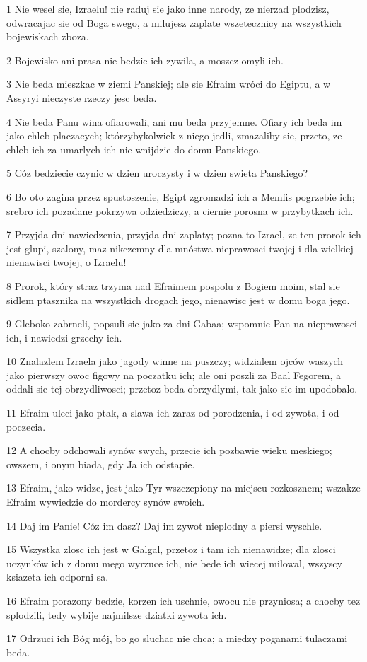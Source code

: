\par 1 Nie wesel sie, Izraelu! nie raduj sie jako inne narody, ze nierzad plodzisz, odwracajac sie od Boga swego, a milujesz zaplate wszetecznicy na wszystkich bojewiskach zboza.
\par 2 Bojewisko ani prasa nie bedzie ich zywila, a moszcz omyli ich.
\par 3 Nie beda mieszkac w ziemi Panskiej; ale sie Efraim wróci do Egiptu, a w Assyryi nieczyste rzeczy jesc beda.
\par 4 Nie beda Panu wina ofiarowali, ani mu beda przyjemne. Ofiary ich beda im jako chleb placzacych; którzybykolwiek z niego jedli, zmazaliby sie, przeto, ze chleb ich za umarlych ich nie wnijdzie do domu Panskiego.
\par 5 Cóz bedziecie czynic w dzien uroczysty i w dzien swieta Panskiego?
\par 6 Bo oto zagina przez spustoszenie, Egipt zgromadzi ich a Memfis pogrzebie ich; srebro ich pozadane pokrzywa odziedziczy, a ciernie porosna w przybytkach ich.
\par 7 Przyjda dni nawiedzenia, przyjda dni zaplaty; pozna to Izrael, ze ten prorok ich jest glupi, szalony, maz nikczemny dla mnóstwa nieprawosci twojej i dla wielkiej nienawisci twojej, o Izraelu!
\par 8 Prorok, który straz trzyma nad Efraimem pospolu z Bogiem moim, stal sie sidlem ptasznika na wszystkich drogach jego, nienawisc jest w domu boga jego.
\par 9 Gleboko zabrneli, popsuli sie jako za dni Gabaa; wspomnic Pan na nieprawosci ich, i nawiedzi grzechy ich.
\par 10 Znalazlem Izraela jako jagody winne na puszczy; widzialem ojców waszych jako pierwszy owoc figowy na poczatku ich; ale oni poszli za Baal Fegorem, a oddali sie tej obrzydliwosci; przetoz beda obrzydlymi, tak jako sie im upodobalo.
\par 11 Efraim uleci jako ptak, a slawa ich zaraz od porodzenia, i od zywota, i od poczecia.
\par 12 A chocby odchowali synów swych, przecie ich pozbawie wieku meskiego; owszem, i onym biada, gdy Ja ich odstapie.
\par 13 Efraim, jako widze, jest jako Tyr wszczepiony na miejscu rozkosznem; wszakze Efraim wywiedzie do mordercy synów swoich.
\par 14 Daj im Panie! Cóz im dasz? Daj im zywot nieplodny a piersi wyschle.
\par 15 Wszystka zlosc ich jest w Galgal, przetoz i tam ich nienawidze; dla zlosci uczynków ich z domu mego wyrzuce ich, nie bede ich wiecej milowal, wszyscy ksiazeta ich odporni sa.
\par 16 Efraim porazony bedzie, korzen ich uschnie, owocu nie przyniosa; a chocby tez splodzili, tedy wybije najmilsze dziatki zywota ich.
\par 17 Odrzuci ich Bóg mój, bo go sluchac nie chca; a miedzy poganami tulaczami beda.


